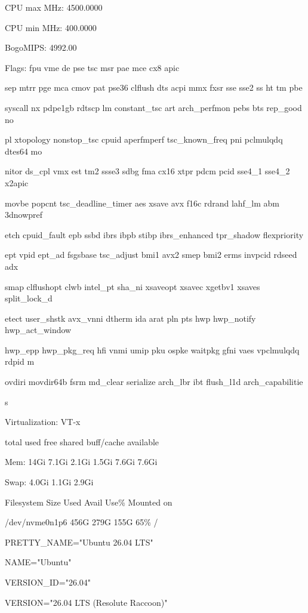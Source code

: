 \documentclass[11pt,a4paper]{article}
\begin{document}
CPU max MHz:                             4500.0000

CPU min MHz:                             400.0000

BogoMIPS:                                4992.00

Flags:                                   fpu vme de pse tsc msr pae mce cx8 apic

sep mtrr pge mca cmov pat pse36 clflush dts acpi mmx fxsr sse sse2 ss ht tm pbe

syscall nx pdpe1gb rdtscp lm constant\_tsc art arch\_perfmon pebs bts rep\_good no

pl xtopology nonstop\_tsc cpuid aperfmperf tsc\_known\_freq pni pclmulqdq dtes64 mo

nitor ds\_cpl vmx est tm2 ssse3 sdbg fma cx16 xtpr pdcm pcid sse4\_1 sse4\_2 x2apic

movbe popcnt tsc\_deadline\_timer aes xsave avx f16c rdrand lahf\_lm abm 3dnowpref

etch cpuid\_fault epb ssbd ibrs ibpb stibp ibrs\_enhanced tpr\_shadow flexpriority

ept vpid ept\_ad fsgsbase tsc\_adjust bmi1 avx2 smep bmi2 erms invpcid rdseed adx

smap clflushopt clwb intel\_pt sha\_ni xsaveopt xsavec xgetbv1 xsaves split\_lock\_d

etect user\_shstk avx\_vnni dtherm ida arat pln pts hwp hwp\_notify hwp\_act\_window

hwp\_epp hwp\_pkg\_req hfi vnmi umip pku ospke waitpkg gfni vaes vpclmulqdq rdpid m

ovdiri movdir64b fsrm md\_clear serialize arch\_lbr ibt flush\_l1d arch\_capabilitie

s

Virtualization:                          VT-x

total        used        free      shared  buff/cache   available

Mem:            14Gi       7.1Gi       2.1Gi       1.5Gi       7.6Gi       7.6Gi

Swap:          4.0Gi       1.1Gi       2.9Gi

Filesystem      Size  Used Avail Use\% Mounted on

/dev/nvme0n1p6  456G  279G  155G  65\% /

PRETTY\_NAME="Ubuntu 26.04 LTS"

NAME="Ubuntu"

VERSION\_ID="26.04"

VERSION="26.04 LTS (Resolute Raccoon)"
\end{document}
